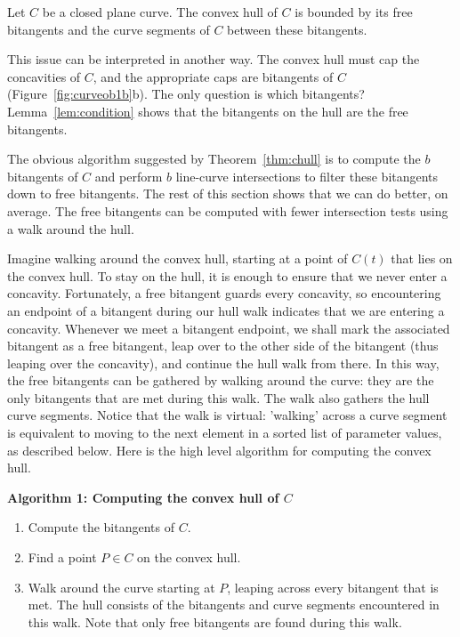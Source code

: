 \documentclass[11pt]{article}
\begin{document}
\begin{theorem}
\label{thm:chull}
Let $C$ be a closed plane curve.
The convex hull of $C$ is bounded by its free bitangents
and the curve segments of $C$ between these bitangents.
\end{theorem}

This issue can be interpreted in another way.
The convex hull must cap the concavities of $C$,
and the appropriate caps are bitangents of $C$ (Figure~\ref{fig:curveob1b}b).
The only question is which bitangents?
Lemma~\ref{lem:condition} shows that the bitangents on the hull are the free bitangents.


The obvious algorithm suggested by Theorem~\ref{thm:chull} is to compute
the $b$ bitangents of $C$ \cite{jj01} and perform $b$ line-curve intersections 
to filter these bitangents down to free bitangents. 
The rest of this section shows that we can do better, on average.
The free bitangents can be computed with fewer intersection tests using a walk around the hull.

Imagine walking around the convex hull, starting at a point of $C(t)$
that lies on the convex hull.
To stay on the hull, it is enough to ensure that we never enter a concavity.
Fortunately, a free bitangent guards every concavity,
so encountering an endpoint of a bitangent during our hull walk
indicates that we are entering a concavity.
Whenever we meet a bitangent endpoint, we shall mark the associated bitangent
as a free bitangent, leap over to the other side of the bitangent
(thus leaping over the concavity), and continue the hull walk from there.
In this way, the free bitangents can be gathered by walking around the curve:
they are the only bitangents that are met during this walk.
The walk also gathers the hull curve segments.
Notice that the walk is virtual:
'walking' across a curve segment is equivalent to moving to the next
element in a sorted list of parameter values, as described below.
Here is the high level algorithm for computing the convex hull.


\clearpage

\centerline{{\bf Algorithm 1: Computing the convex hull of $C$}}

\begin{enumerate}
\item Compute the bitangents of $C$.
\item Find a point $P \in C$ on the convex hull.
\item Walk around the curve starting at $P$, leaping across every bitangent that is met.
  The hull consists of the bitangents and curve segments encountered in this walk.
  Note that only free bitangents are found during this walk.
\end{enumerate}
\end{document}
